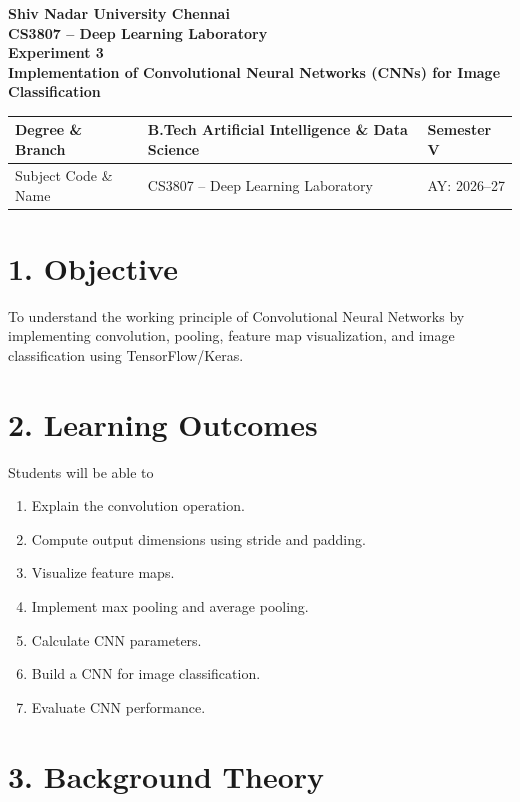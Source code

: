 \documentclass[11pt]{article}
\begin{document}
\begin{center}
{\Large\textbf{Shiv Nadar University Chennai}}\\
\textbf{CS3807 -- Deep Learning Laboratory}\\
\textbf{Experiment 3}\\
{\large\textbf{Implementation of Convolutional Neural Networks (CNNs) for Image Classification}}
\end{center}

\renewcommand{\arraystretch}{1.25}

\begin{tabular}{|p{3.8cm}|p{8cm}|p{2cm}|}
\hline
Degree \& Branch & B.Tech Artificial Intelligence \& Data Science & Semester V\\ \hline
Subject Code \& Name & CS3807 -- Deep Learning Laboratory & AY: 2026--27\\ \hline
\end{tabular}

\section*{1. Objective}

To understand the working principle of Convolutional Neural Networks by implementing convolution, pooling, feature map visualization, and image classification using TensorFlow/Keras.

\section*{2. Learning Outcomes}

Students will be able to

\begin{enumerate}
\item Explain the convolution operation.
\item Compute output dimensions using stride and padding.
\item Visualize feature maps.
\item Implement max pooling and average pooling.
\item Calculate CNN parameters.
\item Build a CNN for image classification.
\item Evaluate CNN performance.
\end{enumerate}

\section*{3. Background Theory}
\end{document}
